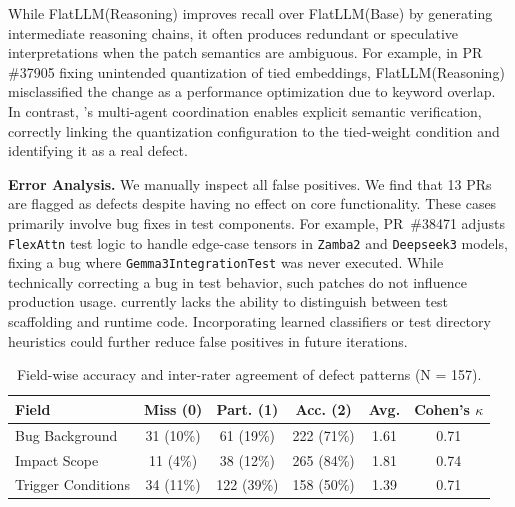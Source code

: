 While FlatLLM(Reasoning) improves recall over FlatLLM(Base) by generating intermediate reasoning chains, it often produces redundant or speculative interpretations when the patch semantics are ambiguous.
For example, in PR \#37905 fixing unintended quantization of tied embeddings, FlatLLM(Reasoning) misclassified the change as a performance optimization due to keyword overlap.
In contrast, \appname’s multi-agent coordination enables explicit semantic verification, correctly linking the quantization configuration to the tied-weight condition and identifying it as a real defect.

\noindent\textbf{Error Analysis.}
We manually inspect all false positives.
We find that 13 PRs are flagged as defects despite having no effect on core functionality.
These cases primarily involve bug fixes in test components.
For example, PR~\#38471 adjusts \texttt{FlexAttn} test logic to handle edge-case tensors in \texttt{Zamba2} and \texttt{Deepseek3} models, fixing a bug where \texttt{Gemma3IntegrationTest} was never executed.
While technically correcting a bug in test behavior, such patches do not influence production usage.
\appname currently lacks the ability to distinguish between test scaffolding and runtime code.
Incorporating learned classifiers or test directory heuristics could further reduce false positives in future iterations.


\begin{table}[ht]
\centering
\small
\setlength{\tabcolsep}{3pt}
\caption{Field-wise accuracy and inter-rater agreement of defect patterns (N = 157).}
\label{tab:field-score}
\begin{tabular}{lccccc}
\toprule
\textbf{Field} & \textbf{Miss (0)} & \textbf{Part. (1)} & \textbf{Acc. (2)} & \textbf{Avg.} & \textbf{Cohen’s $\kappa$} \\
\midrule
Bug Background & 31 (10\%) & 61 (19\%) & 222 (71\%) & 1.61 & 0.71 \\
Impact Scope & 11 (4\%) & 38 (12\%) & 265 (84\%) & 1.81 & 0.74 \\
Trigger Conditions & 34 (11\%) & 122 (39\%) & 158 (50\%) & 1.39 & 0.71 \\
\bottomrule
\end{tabular}
\vspace{-0.35cm}
\end{table}

